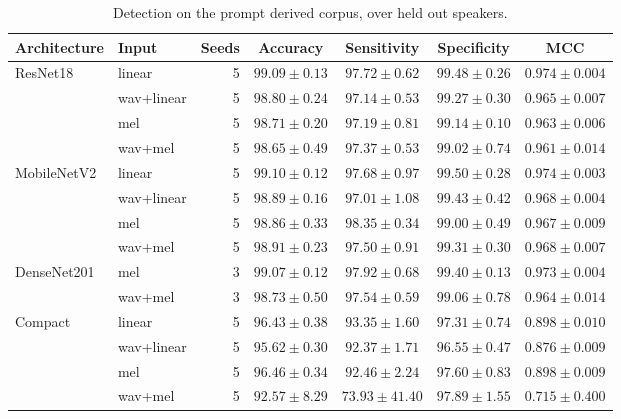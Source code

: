 \begin{table}[tbp]
\caption{Detection on the prompt derived corpus, over held out speakers.}\label{tab:grid}
\small
\begin{tabular}{@{}llrcccc@{}}
\toprule
Architecture & Input & Seeds & Accuracy & Sensitivity & Specificity & MCC \\
\midrule
ResNet18 & linear & 5 & $99.09 \pm 0.13$ & $97.72 \pm 0.62$ & $99.48 \pm 0.26$ & $0.974 \pm 0.004$ \\
 & wav+linear & 5 & $98.80 \pm 0.24$ & $97.14 \pm 0.53$ & $99.27 \pm 0.30$ & $0.965 \pm 0.007$ \\
 & mel & 5 & $98.71 \pm 0.20$ & $97.19 \pm 0.81$ & $99.14 \pm 0.10$ & $0.963 \pm 0.006$ \\
 & wav+mel & 5 & $98.65 \pm 0.49$ & $97.37 \pm 0.53$ & $99.02 \pm 0.74$ & $0.961 \pm 0.014$ \\
\addlinespace
MobileNetV2 & linear & 5 & $99.10 \pm 0.12$ & $97.68 \pm 0.97$ & $99.50 \pm 0.28$ & $0.974 \pm 0.003$ \\
 & wav+linear & 5 & $98.89 \pm 0.16$ & $97.01 \pm 1.08$ & $99.43 \pm 0.42$ & $0.968 \pm 0.004$ \\
 & mel & 5 & $98.86 \pm 0.33$ & $98.35 \pm 0.34$ & $99.00 \pm 0.49$ & $0.967 \pm 0.009$ \\
 & wav+mel & 5 & $98.91 \pm 0.23$ & $97.50 \pm 0.91$ & $99.31 \pm 0.30$ & $0.968 \pm 0.007$ \\
\addlinespace
DenseNet201 & mel & 3 & $99.07 \pm 0.12$ & $97.92 \pm 0.68$ & $99.40 \pm 0.13$ & $0.973 \pm 0.004$ \\
 & wav+mel & 3 & $98.73 \pm 0.50$ & $97.54 \pm 0.59$ & $99.06 \pm 0.78$ & $0.964 \pm 0.014$ \\
\addlinespace
Compact & linear & 5 & $96.43 \pm 0.38$ & $93.35 \pm 1.60$ & $97.31 \pm 0.74$ & $0.898 \pm 0.010$ \\
 & wav+linear & 5 & $95.62 \pm 0.30$ & $92.37 \pm 1.71$ & $96.55 \pm 0.47$ & $0.876 \pm 0.009$ \\
 & mel & 5 & $96.46 \pm 0.34$ & $92.46 \pm 2.24$ & $97.60 \pm 0.83$ & $0.898 \pm 0.009$ \\
 & wav+mel & 5 & $92.57 \pm 8.29$ & $73.93 \pm 41.40$ & $97.89 \pm 1.55$ & $0.715 \pm 0.400$ \\
\bottomrule
\end{tabular}
\end{table}

